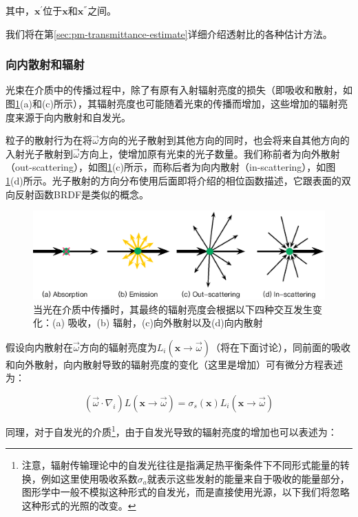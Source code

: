\noindent 其中，$\mathbf{x}^{'}$位于$\mathbf{x}$和$\mathbf{x}^{''}$之间。

我们将在第\ref{sec:pm-transmittance-estimate}详细介绍透射比的各种估计方法。




\subsubsection{向内散射和辐射}
光束在介质中的传播过程中，除了有原有入射辐射亮度的损失（即吸收和散射，如图\ref{f:pm-medium-properties}(a)和(c)所示），其辐射亮度也可能随着光束的传播而增加，这些增加的辐射亮度来源于向内散射和自发光。

粒子的散射行为在将$\vec{\omega}$方向的光子散射到其他方向的同时，也会将来自其他方向的入射光子散射到$\vec{\omega}$方向上，使增加原有光束的光子数量。我们称前者为向外散射（out-scattering），如图\ref{f:pm-medium-properties}(c)所示，而称后者为向内散射（in-scattering），如图\ref{f:pm-medium-properties}(d)所示。光子散射的方向分布使用后面即将介绍的相位函数描述，它跟表面的双向反射函数BRDF是类似的概念。

\begin{figure}
	\includegraphics[width=1.\textwidth]{figures/pm/medium-properties}
	\caption{当光在介质中传播时，其最终的辐射亮度会根据以下四种交互发生变化：(a) 吸收，(b) 辐射，(c)向外散射以及(d)向内散射}
	\label{f:pm-medium-properties}
\end{figure}

假设向内散射在$\vec{\omega}$方向的辐射亮度为$L_i(\mathbf{x}\to\vec{\omega})$（将在下面讨论），同前面的吸收和向外散射，向内散射导致的辐射亮度的变化（这里是增加）可有微分方程表述为：

\begin{equation}\label{e:pm-in-scattering}
	(\vec{\omega}\cdot\nabla_i)L(\mathbf{x}\to\vec{\omega})=
	\sigma_s(\mathbf{x})L_i(\mathbf{x}\to\vec{\omega})
\end{equation}

同理，对于自发光的介质\footnote{注意，辐射传输理论中的自发光往往是指满足热平衡条件下不同形式能量的转换，例如这里使用吸收系数$\sigma_a$就表示这些发射的能量来自于吸收的能量部分，图形学中一般不模拟这种形式的自发光，而是直接使用光源，以下我们将忽略这种形式的光照的改变。}，由于自发光导致的辐射亮度的增加也可以表述为：

